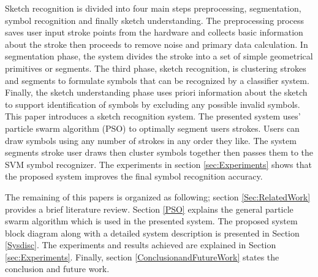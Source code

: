 \documentclass[a4paper,10pt]{IEEEconf}
\begin{document}
Sketch recognition is divided into four main steps preprocessing, segmentation, symbol recognition and finally sketch understanding. The preprocessing process saves user input stroke points from the hardware and collects basic information about the stroke then proceeds to remove noise and primary data calculation. In segmentation phase, the system divides the stroke into a set of simple geometrical primitives or segments. The third phase, sketch recognition, is clustering strokes and segments to formulate symbols that can be recognized by a classifier system. Finally, the sketch understanding phase uses priori information about the sketch to support identification of symbols by excluding any possible invalid symbols. 
This paper introduces a sketch recognition system. The presented system uses' particle swarm algorithm (PSO) to optimally segment users strokes. Users can draw symbols using any number of strokes in any order they like. The system segments stroke user draws then cluster symbols together then passes them to the SVM symbol recognizer. The experiments in section \ref{sec:Experiments} shows that the proposed system improves the final symbol recognition accuracy. 

The remaining of this papers is organized as following; section \ref{Sec:RelatedWork} provides a brief literature review.  Section \ref{PSO} explains the general particle swarm algorithm which is used in the presented system. The proposed system block diagram along with a detailed system description is presented in Section \ref{Sysdisc}.  The experiments and results achieved are explained in Section \ref{sec:Experiments}. Finally, section \ref{ConclusionandFutureWork} states the conclusion and future work. 
\end{document}
